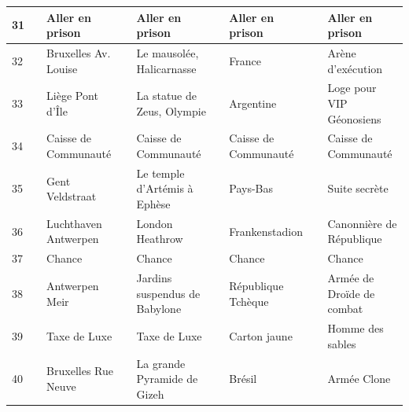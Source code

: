 \documentclass[letterpaper]{article}
\begin{document}
{\begin{tabular}{|l|l|l|l|l|l|l|l|l|}
      31 & \cellcolor[HTML]{BEBEBE} & Aller en prison & \cellcolor[HTML]{BEBEBE} & Aller en prison & \cellcolor[HTML]{BEBEBE} & Aller en prison & \cellcolor[HTML]{BEBEBE} & Aller en prison \\ \hline
      32 & \cellcolor[HTML]{2E8B57} & Bruxelles Av. Louise & \cellcolor[HTML]{2E8B57} & Le mausolée, Halicarnasse & \cellcolor[HTML]{2E8B57} & France & \cellcolor[HTML]{2E8B57} & Arène d'exécution \\ \hline
      33 & \cellcolor[HTML]{2E8B57} & Liège Pont d'Île & \cellcolor[HTML]{2E8B57} & La statue de Zeus, Olympie & \cellcolor[HTML]{2E8B57} & Argentine & \cellcolor[HTML]{2E8B57} & Loge pour VIP Géonosiens \\ \hline
      34 & \cellcolor[HTML]{EEEED1} & Caisse de Communauté & \cellcolor[HTML]{EEEED1} & Caisse de Communauté & \cellcolor[HTML]{EEEED1} & Caisse de Communauté & \cellcolor[HTML]{EEEED1} & Caisse de Communauté \\ \hline
      35 & \cellcolor[HTML]{2E8B57} & Gent Veldstraat & \cellcolor[HTML]{2E8B57} & Le temple d'Artémis à Ephèse & \cellcolor[HTML]{2E8B57} & Pays-Bas & \cellcolor[HTML]{2E8B57} & Suite secrète \\ \hline
      36 & \cellcolor[HTML]{E6E6FA} & Luchthaven Antwerpen & \cellcolor[HTML]{E6E6FA} & London Heathrow & \cellcolor[HTML]{E6E6FA} & Frankenstadion & \cellcolor[HTML]{E6E6FA} & Canonnière de République \\ \hline
      37 & \cellcolor[HTML]{FFC1C1} & Chance & \cellcolor[HTML]{FFC1C1} & Chance & \cellcolor[HTML]{FFC1C1} & Chance & \cellcolor[HTML]{FFC1C1} & Chance \\ \hline
      38 & \cellcolor[HTML]{483D8B} & Antwerpen Meir & \cellcolor[HTML]{483D8B} & Jardins suspendus de Babylone & \cellcolor[HTML]{483D8B} & République Tchèque & \cellcolor[HTML]{483D8B} & Armée de Droïde de combat \\ \hline
      39 & \cellcolor[HTML]{8B1A1A} & Taxe de Luxe & \cellcolor[HTML]{8B1A1A} & Taxe de Luxe & \cellcolor[HTML]{8B1A1A} & Carton jaune & \cellcolor[HTML]{8B1A1A} & Homme des sables \\ \hline
      40 & \cellcolor[HTML]{483D8B} & Bruxelles Rue Neuve & \cellcolor[HTML]{483D8B} & La grande Pyramide de Gizeh &\cellcolor[HTML]{483D8B} & Brésil &\cellcolor[HTML]{483D8B} & Armée Clone\\ \hline
      \end{tabular}
    }
    
    \newpage
    
\end{document}

